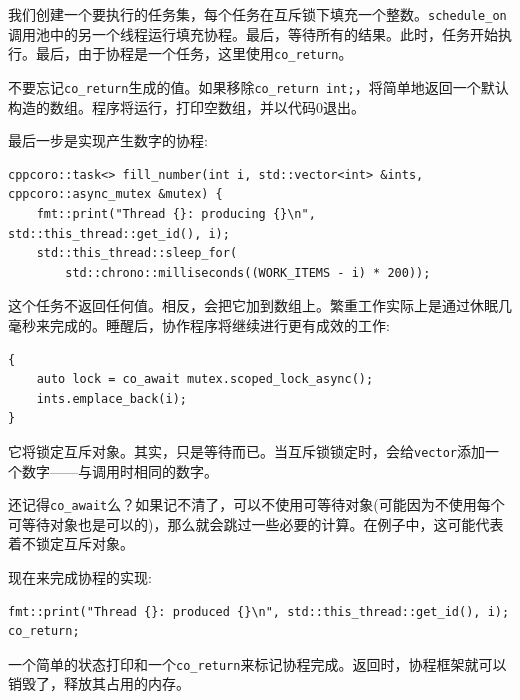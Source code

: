 我们创建一个要执行的任务集，每个任务在互斥锁下填充一个整数。\texttt{schedule\_on}调用池中的另一个线程运行填充协程。最后，等待所有的结果。此时，任务开始执行。最后，由于协程是一个任务，这里使用\texttt{co\_return}。

\begin{tcolorbox}[colback=blue!5!white,colframe=blue!75!black, title=Note]
\hspace*{0.7cm}不要忘记\texttt{co\_return}生成的值。如果移除\texttt{co\_return int;}，将简单地返回一个默认构造的数组。程序将运行，打印空数组，并以代码0退出。
\end{tcolorbox}

最后一步是实现产生数字的协程:

\begin{lstlisting}[style=styleCXX]
cppcoro::task<> fill_number(int i, std::vector<int> &ints,
cppcoro::async_mutex &mutex) {
	fmt::print("Thread {}: producing {}\n", std::this_thread::get_id(), i);
	std::this_thread::sleep_for(
		std::chrono::milliseconds((WORK_ITEMS - i) * 200));
\end{lstlisting}

这个任务不返回任何值。相反，会把它加到数组上。繁重工作实际上是通过休眠几毫秒来完成的。睡醒后，协作程序将继续进行更有成效的工作:

\begin{lstlisting}[style=styleCXX]
{
	auto lock = co_await mutex.scoped_lock_async();
	ints.emplace_back(i);
}
\end{lstlisting}

它将锁定互斥对象。其实，只是等待而已。当互斥锁锁定时，会给\texttt{vector}添加一个数字——与调用时相同的数字。

\begin{tcolorbox}[colback=blue!5!white,colframe=blue!75!black, title=Note]
\hspace*{0.7cm}还记得\texttt{co\_await}么？如果记不清了，可以不使用可等待对象(可能因为不使用每个可等待对象也是可以的)，那么就会跳过一些必要的计算。在例子中，这可能代表着不锁定互斥对象。
\end{tcolorbox}

现在来完成协程的实现:

\begin{lstlisting}[style=styleCXX]
 fmt::print("Thread {}: produced {}\n", std::this_thread::get_id(), i);
co_return;
\end{lstlisting}

一个简单的状态打印和一个\texttt{co\_return}来标记协程完成。返回时，协程框架就可以销毁了，释放其占用的内存。

